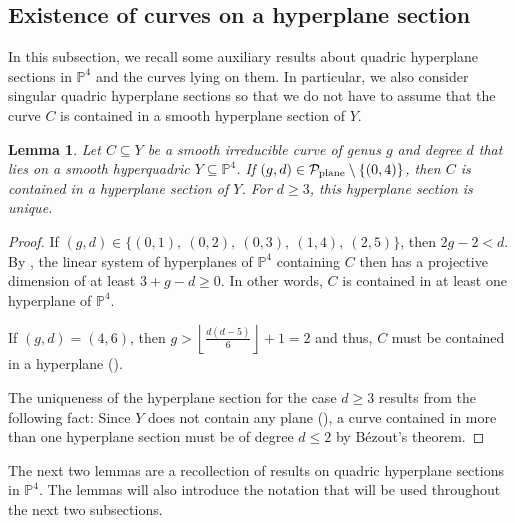 \documentclass[english,11pt,reqno]{amsart}
\newcommand{\sub}{\subseteq}
\newcommand{\Pfour}{\mathbb{P}^4}
\newtheorem{lem}[thm]{Lemma}
\begin{document}
\subsection{Existence of curves on a hyperplane section} \label{subsection:hyperplane_preliminaries}
%
In this subsection, we recall some auxiliary results about quadric hyperplane sections in $\Pfour$ and the curves lying on them. In particular, we also consider singular quadric hyperplane sections so that we do not have to assume that the curve $C$ is contained in a smooth hyperplane section of $Y$. 
%
\begin{lem} \label{lem:contained_in_hyperplane_section}
Let $C \sub Y$ be a smooth irreducible curve of genus $g$ and degree $d$ that lies on a smooth hyperquadric $Y \sub \Pfour$. If $ (g,d) \in \mathcal{P}_{\textup{plane}} \setminus \{(0,4)\}$, then $C$ is contained in a hyperplane section of $Y$. For $d\geq 3$, this hyperplane section is unique.
\end{lem}
%
\begin{proof}
If $(g,d)\in\{(0,1),\:(0,2),\:(0,3),\:(1,4),\:(2,5)\}$, then $2g-2<d$. By , the linear system of hyperplanes of $\Pfour$ containing $C$ then has a projective dimension of at least $3+g-d \geq 0$. In other words, $C$ is contained in at least one hyperplane of $\Pfour$. \par 
If $(g,d)=(4,6)$, then $g > \left \lfloor \frac{d(d-5)}{6} \right \rfloor + 1 = 2$ and thus, $C$ must be contained in a hyperplane (\cite[Corollary 2.7(2)]{Blanc_Lamy_Cubic}). \par
The uniqueness of the hyperplane section for the case $d \geq 3$ results from the following fact: Since $Y$ does not contain any plane (), a curve contained in more than one hyperplane section must be of degree $d\leq 2$ by Bézout's theorem.
\end{proof}
%
The next two lemmas are a recollection of results on quadric hyperplane sections in $\Pfour$. The lemmas will also introduce the notation that will be used throughout the next two subsections.
%
\end{document}
